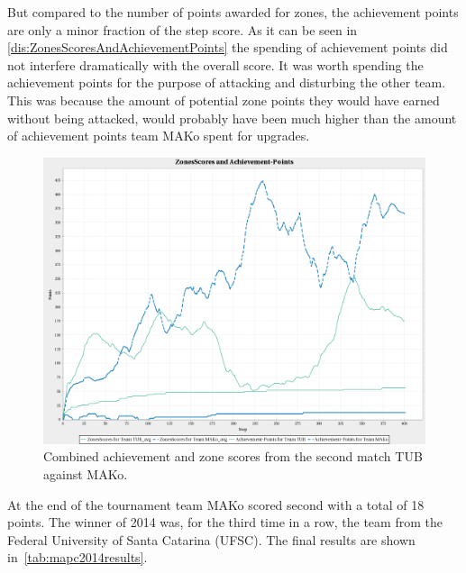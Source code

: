 But compared to the number of points awarded for zones, the achievement points are only a minor fraction of the step score.
As it can be seen in \autoref{dis:ZonesScoresAndAchievementPoints} the spending of achievement points did not interfere dramatically with the overall score.
It was worth spending the achievement points for the purpose of attacking and disturbing the other team.
This was because the amount of potential zone points they would have earned without being attacked, would probably have been much higher than the amount of achievement points team MAKo spent for upgrades.
\begin{figure}[h]
	\centering
	\includegraphics[width=\textwidth]{images/ZonesScoresAndAchievementPoints.png}
	\caption{Combined achievement and zone scores from the second match TUB against MAKo.} %
	\label{dis:ZonesScoresAndAchievementPoints}
\end{figure}
At the end of the tournament team MAKo scored second with a total of 18 points.
The winner of 2014 was, for the third time in a row, the team from the Federal University of Santa Catarina (UFSC).
The final results are shown in~\autoref{tab:mapc2014results}.
